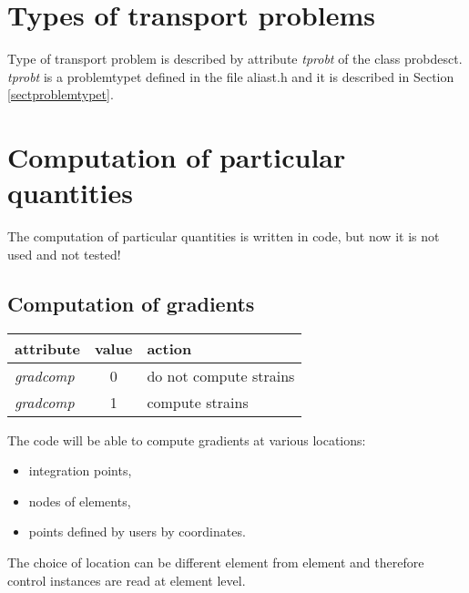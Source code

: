 \section{Types of transport problems}
Type of transport problem is described by attribute {\it tprobt} of the class {\sf probdesct}. {\it tprobt}
is a {\sf problemtypet} defined in the file aliast.h and it is described in Section \ref{sectproblemtypet}.

\section{Computation of particular quantities}

The computation of particular quantities is written in code, but now it is not used and not tested!

\subsection{Computation of gradients}
\label{sectgradcomp}

\begin{center}
\begin{tabular}{|l|c|l|}
\hline
attribute & value & action
\\ \hline \hline
{\it gradcomp} & 0 & do not compute strains
\\ \hline
{\it gradcomp} & 1 & compute strains
\\ \hline
\end{tabular}
\label{tabgradcompcontr}
\end{center}

The code will be able to compute gradients at various locations:
\begin{itemize}
\item{integration points,}
\item{nodes of elements,}
\item{points defined by users by coordinates.}
\end{itemize}
The choice of location can be different element from element and therefore control instances are read
at element level.

